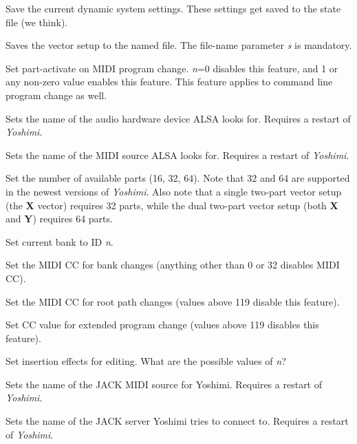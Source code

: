       Save the current dynamic system settings.
      These settings get saved to the state file (we think).

      Saves the vector setup to the named file.
      The file-name parameter \textsl{s} is mandatory.

      Set part-activate on MIDI program change.
      \textsl{n}=0 disables this feature, and
      1 or any non-zero value enables this feature.
      This feature applies to command line program change as well.

      Sets the name of the audio hardware device ALSA looks for.
      Requires a restart of \textsl{Yoshimi}.

      Sets the name of the MIDI source ALSA looks for.
      Requires a restart of \textsl{Yoshimi}.

      Set the number of available parts (16, 32, 64).
      Note that 32 and 64 are supported in the newest versions of
      \textsl{Yoshimi}.  Also note that a single two-part vector setup (the
      \textbf{X} vector) requires 32 parts, while the dual two-part vector
      setup (both \textbf{X} and \textbf{Y}) requires 64 parts.

      Set current bank to ID \textsl{n}.

      Set the MIDI CC for bank changes (anything other than 0 or 32
      disables MIDI CC).

      Set the MIDI CC for root path changes (values above 119 disable this
      feature).

      Set CC value for extended program change (values above 119 disables this
      feature).

      Set insertion effects for editing.
      What are the possible values of \textsl{n}?

      Sets the name of the JACK MIDI source for Yoshimi.
      Requires a restart of \textsl{Yoshimi}.

      Sets the name of the JACK server Yoshimi tries to connect to.
      Requires a restart of \textsl{Yoshimi}.

